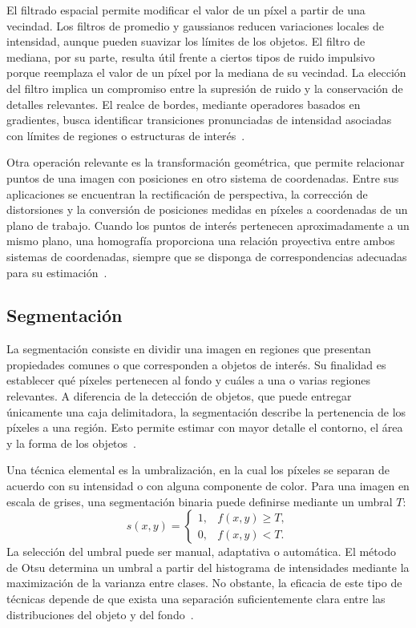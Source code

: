 El filtrado espacial permite modificar el valor de un píxel a partir de una vecindad. Los filtros de promedio y gaussianos reducen variaciones locales de intensidad, aunque pueden suavizar los límites de los objetos. El filtro de mediana, por su parte, resulta útil frente a ciertos tipos de ruido impulsivo porque reemplaza el valor de un píxel por la mediana de su vecindad. La elección del filtro implica un compromiso entre la supresión de ruido y la conservación de detalles relevantes. El realce de bordes, mediante operadores basados en gradientes, busca identificar transiciones pronunciadas de intensidad asociadas con límites de regiones o estructuras de interés~\cite{gonzalez2018digital}.

Otra operación relevante es la transformación geométrica, que permite relacionar puntos de una imagen con posiciones en otro sistema de coordenadas. Entre sus aplicaciones se encuentran la rectificación de perspectiva, la corrección de distorsiones y la conversión de posiciones medidas en píxeles a coordenadas de un plano de trabajo. Cuando los puntos de interés pertenecen aproximadamente a un mismo plano, una homografía proporciona una relación proyectiva entre ambos sistemas de coordenadas, siempre que se disponga de correspondencias adecuadas para su estimación~\cite{szeliski2022computer,corke2017robotics}.

\subsection{Segmentación}
La segmentación consiste en dividir una imagen en regiones que presentan propiedades comunes o que corresponden a objetos de interés. Su finalidad es establecer qué píxeles pertenecen al fondo y cuáles a una o varias regiones relevantes. A diferencia de la detección de objetos, que puede entregar únicamente una caja delimitadora, la segmentación describe la pertenencia de los píxeles a una región. Esto permite estimar con mayor detalle el contorno, el área y la forma de los objetos~\cite{gonzalez2018digital,szeliski2022computer}.

Una técnica elemental es la umbralización, en la cual los píxeles se separan de acuerdo con su intensidad o con alguna componente de color. Para una imagen en escala de grises, una segmentación binaria puede definirse mediante un umbral $T$:
\begin{equation}
    s(x,y)=
    \begin{cases}
        1, & f(x,y)\geq T,\\
        0, & f(x,y)<T.
    \end{cases}
\end{equation}
La selección del umbral puede ser manual, adaptativa o automática. El método de Otsu determina un umbral a partir del histograma de intensidades mediante la maximización de la varianza entre clases. No obstante, la eficacia de este tipo de técnicas depende de que exista una separación suficientemente clara entre las distribuciones del objeto y del fondo~\cite{otsu1979threshold}.

